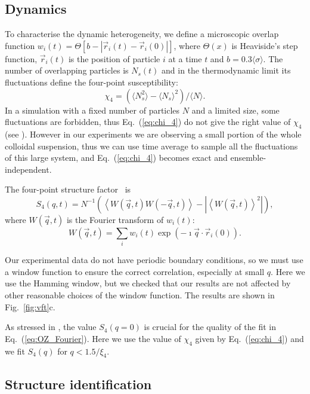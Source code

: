 \subsection*{Dynamics}

To characterise the dynamic heterogeneity, we define a microscopic overlap function $w_i(t) = \Theta [b - |\vec{r}_i(t) - \vec{r}_i(0)|]$, where $\Theta(x)$ is Heaviside’s step function, $\vec{r}_i(t)$ is the position
of particle $i$ at a time $t$ and $b=0.3\langle\sigma\rangle$.
The number of overlapping particles is $N_s(t)$ and in the thermodynamic limit its fluctuations define the four-point susceptibility:
\begin{equation}
\chi_4 = (\langle N_s^2\rangle - \langle N_s\rangle^2) /  \langle N\rangle. 
\label{eq:chi_4}
\end{equation}
In a simulation with a fixed number of particles $N$ and a limited size, some fluctuations are forbidden, thus Eq.~(\ref{eq:chi_4}) do not give the right value of $\chi_4$ (see \citep{Flenner2011}). However in our experiments we are observing a small portion of the whole colloidal suspension, thus we can use time average to sample all the fluctuations of this large system, and Eq.~(\ref{eq:chi_4}) becomes exact and ensemble-independent.

The four-point structure factor~\cite{Flenner2011} is
\begin{equation}
	S_4(q,t) = N^{-1}(\left\langle W(\vec{q},t) W(-\vec{q},t) \right\rangle - | \left\langle W(\vec{q},t) \right\rangle^2 |),   
	\label{eq:S4}
\end{equation}
where $W(\vec{q},t)$ is the Fourier transform of $w_i(t)$: 
\begin{equation}
	W(\vec{q},t) = \sum_i w_i(t)\exp(-\imath \vec{q}\cdot\vec{r}_i(0)).  
\end{equation}


Our experimental data do not have periodic boundary conditions, so we must use a window function to ensure the correct correlation, especially at small $q$. Here we use the Hamming window, but we checked that our results are not affected by other reasonable choices of the window function. The results are shown in Fig.~\ref{fig:vft}c.

As stressed in \citep{Flenner2011}, the value $S_4(q=0)$ is crucial for the quality of the fit in Eq.~(\ref{eq:OZ_Fourier}). Here we use the value of $\chi_4$ given by Eq.~(\ref{eq:chi_4}) and we fit $S_4(q)$ for $q<1.5/\xi_4$.

\subsection*{Structure identification}

